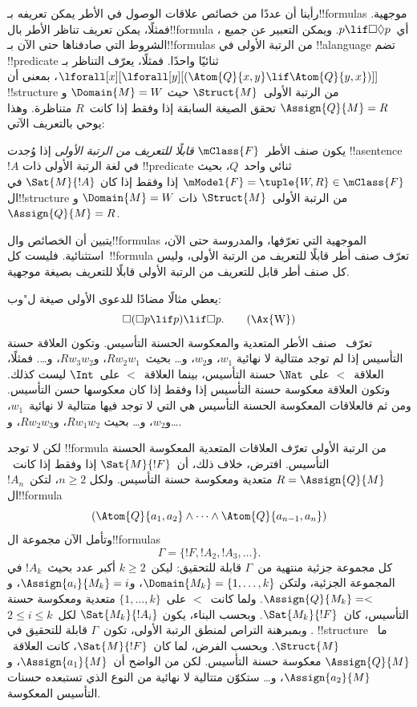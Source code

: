 \documentclass[../../../include/open-logic-section]{subfiles}
\begin{document}


رأينا أن عددًا من خصائص علاقات الوصول في الأطر يمكن تعريفه
بـ!!{formula}s موجهية. فمثلًا، يمكن تعريف تناظر الأطر بال!!{formula}
، أي~$p \lif \Box\Diamond p$. ويمكن التعبير عن جميع الشروط التي
صادفناها حتى الآن بـ!!{formula}s من الرتبة الأولى في !!a{language}
تضم !!{predicate} ثنائيًا واحدًا. فمثلًا، يعرّف التناظر بـ
$\lforall[x][\lforall[y][(\Atom{Q}{x,y} \lif \Atom{Q}{y, x})]]$،
بمعنى أن !!{structure} من الرتبة الأولى~$\Struct{M}$ حيث
$\Domain{M} = W$ و$\Assign{Q}{M} = R$ تحقق الصيغة السابقة إذا وفقط
إذا كانت~$R$ متناظرة. وهذا يوحي بالتعريف الآتي:

\begin{defn}
  يكون صنف الأطر~$\mClass{F}$ \emph{قابلًا للتعريف من الرتبة الأولى}
  إذا وُجدت !!a{sentence}~$!A$ في لغة الرتبة الأولى ذات
  !!{predicate} ثنائي واحد~$Q$، بحيث
  $\mModel{F} = \tuple{W, R} \in \mClass{F}$ إذا وفقط إذا كان
  $\Sat{M}{!A}$ في ال!!{structure} من الرتبة الأولى~$\Struct{M}$ ذات
  $\Domain{M} = W$ و$\Assign{Q}{M} = R$.
\end{defn}

يتبين أن الخصائص وال!!{formula}s الموجهية التي تعرّفها، والمدروسة حتى
الآن، استثنائية. فليست كل~!!{formula} تعرّف صنف أطر قابلًا للتعريف من
الرتبة الأولى، وليس كل صنف أطر قابل للتعريف من الرتبة الأولى قابلًا
للتعريف بصيغة موجهية.

يعطي مثالًا مضادًا للدعوى الأولى صيغة ل"وب:
\begin{equation}
\Box(\Box p \lif p) \lif \Box p. \tag{\Ax{W}}
\end{equation}
تعرّف~ صنف الأطر المتعدية والمعكوسة الحسنة التأسيس. وتكون
العلاقة حسنة التأسيس إذا لم توجد متتالية لا نهائية
$w_1$، و$w_2$، و\dots{} بحيث~$Rw_2w_1$، و$Rw_3w_2$، و\dots. فمثلًا،
العلاقة~$<$ على~$\Nat$ حسنة التأسيس، بينما العلاقة~$<$ على~$\Int$
ليست كذلك. وتكون العلاقة معكوسة حسنة التأسيس إذا وفقط إذا كان
معكوسها حسن التأسيس. ومن ثم فالعلاقات المعكوسة الحسنة التأسيس هي التي
لا توجد فيها متتالية لا نهائية~$w_1$، و$w_2$، و\dots{} بحيث
$Rw_1w_2$، و$Rw_2w_3$، و\dots.

لكن لا توجد !!{formula} من الرتبة الأولى تعرّف العلاقات المتعدية
المعكوسة الحسنة التأسيس. افترض، خلاف ذلك، أن~$\Sat{M}{!F}$ إذا وفقط
إذا كانت~$R = \Assign{Q}{M}$ متعدية ومعكوسة حسنة التأسيس. ولكل
$n \ge 2$، لتكن~$!A_n$ ال!!{formula}
\[
(\Atom{Q}{a_1,a_2} \land \dots \land
    \Atom{Q}{a_{n-1},a_{n}})
\]
وتأمل الآن مجموعة ال!!{formula}s
\[
\Gamma = \{!F, !A_2, !A_3, \dots\}.
\]
كل مجموعة جزئية منتهية من~$\Gamma$ قابلة للتحقيق: ليكن~$k \ge 2$
أكبر عدد بحيث~$!A_k$ في المجموعة الجزئية، ولتكن
$\Domain{M_k} = \{1, \dots, k\}$، و$\Assign{a_i}{M_k} = i$، و
$\Assign{Q}{M_k} = <$. ولما كانت~$<$ على~$\{1, \dots, k\}$ متعدية
ومعكوسة حسنة التأسيس، كان~$\Sat{M_k}{!F}$. وبحسب البناء، يكون
$\Sat{M_k}{!A_i}$ لكل~$2 \le i \le k$. وبمبرهنة التراص لمنطق الرتبة
الأولى، تكون~$\Gamma$ قابلة للتحقيق في !!{structure} ما~$\Struct{M}$.
وبحسب الفرض، لما كان~$\Sat{M}{!F}$، كانت العلاقة~$\Assign{Q}{M}$
معكوسة حسنة التأسيس. لكن من الواضح أن~$\Assign{a_1}{M}$، و
$\Assign{a_2}{M}$، و\dots{} ستكوّن متتالية لا نهائية من النوع الذي
تستبعده حسنات التأسيس المعكوسة.
\end{document}
